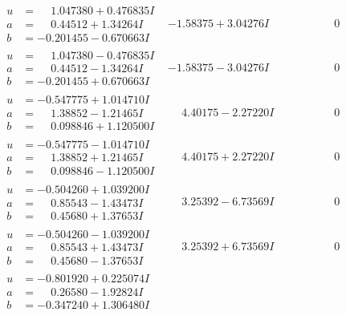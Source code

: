 \documentclass[1p]{elsarticle_modified}
\theoremstyle{definition}
\begin{document}
$$\begin{array}{c|c|c}
\begin{aligned}
u &= \phantom{-}1.047380 + 0.476835 I \\
a &= \phantom{-}0.44512 + 1.34264 I \\
b &= -0.201455 - 0.670663 I\end{aligned}
 & -1.58375 + 3.04276 I & \phantom{-0.000000 } 0 \\ \hline\begin{aligned}
u &= \phantom{-}1.047380 - 0.476835 I \\
a &= \phantom{-}0.44512 - 1.34264 I \\
b &= -0.201455 + 0.670663 I\end{aligned}
 & -1.58375 - 3.04276 I & \phantom{-0.000000 } 0 \\ \hline\begin{aligned}
u &= -0.547775 + 1.014710 I \\
a &= \phantom{-}1.38852 - 1.21465 I \\
b &= \phantom{-}0.098846 + 1.120500 I\end{aligned}
 & \phantom{-}4.40175 - 2.27220 I & \phantom{-0.000000 } 0 \\ \hline\begin{aligned}
u &= -0.547775 - 1.014710 I \\
a &= \phantom{-}1.38852 + 1.21465 I \\
b &= \phantom{-}0.098846 - 1.120500 I\end{aligned}
 & \phantom{-}4.40175 + 2.27220 I & \phantom{-0.000000 } 0 \\ \hline\begin{aligned}
u &= -0.504260 + 1.039200 I \\
a &= \phantom{-}0.85543 - 1.43473 I \\
b &= \phantom{-}0.45680 + 1.37653 I\end{aligned}
 & \phantom{-}3.25392 - 6.73569 I & \phantom{-0.000000 } 0 \\ \hline\begin{aligned}
u &= -0.504260 - 1.039200 I \\
a &= \phantom{-}0.85543 + 1.43473 I \\
b &= \phantom{-}0.45680 - 1.37653 I\end{aligned}
 & \phantom{-}3.25392 + 6.73569 I & \phantom{-0.000000 } 0 \\ \hline\begin{aligned}
u &= -0.801920 + 0.225074 I \\
a &= \phantom{-}0.26580 - 1.92824 I \\
b &= -0.347240 + 1.306480 I\end{aligned}

\end{array}$$
\end{document}
